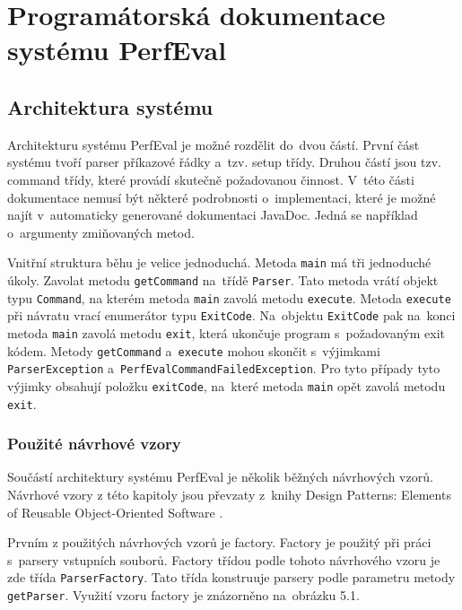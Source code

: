 \chapter{Programátorská dokumentace systému PerfEval}

\section{Architektura systému}

Architekturu systému PerfEval je možné rozdělit do~dvou částí. První část systému tvoří
parser příkazové řádky a~tzv. setup třídy. Druhou částí jsou tzv. command třídy,
které provádí skutečně požadovanou činnost. V~této části dokumentace nemusí být
některé podrobnosti o~implementaci, které je možné najít v~automaticky generované dokumentaci
JavaDoc. Jedná se například o~argumenty zmiňovaných metod.

Vnitřní struktura běhu je velice jednoduchá. Metoda \lstinline{main} má tři jednoduché úkoly.
Zavolat metodu \lstinline{getCommand} na~třídě \lstinline{Parser}. Tato metoda vrátí objekt typu \lstinline{Command},
na kterém metoda \lstinline{main} zavolá metodu \lstinline{execute}. Metoda \lstinline{execute} při návratu vrací enumerátor
typu \lstinline{ExitCode}. Na~objektu \lstinline{ExitCode} pak na~konci metoda \lstinline{main} zavolá metodu \lstinline[keywords={}]{exit},
která ukončuje program s~požadovaným exit kódem. Metody \lstinline{getCommand} a~\lstinline{execute} mohou skončit
s~výjimkami \lstinline{ParserException} a~\lstinline{PerfEvalCommandFailedException}. Pro tyto případy tyto
výjimky obsahují položku \lstinline{exitCode}, na~které metoda \lstinline{main} opět zavolá metodu \lstinline[keywords={}]{exit}.

\subsection{Použité návrhové vzory}

Součástí architektury systému PerfEval je několik běžných návrhových vzorů.
Návrhové vzory z této kapitoly jsou převzaty z~knihy Design Patterns: Elements of Reusable Object-Oriented Software \cite{Patterns}.

Prvním z použitých návrhových vzorů je factory. Factory je použitý
při práci s~parsery vstupních souborů. Factory třídou podle tohoto návrhového vzoru je
zde třída \lstinline{ParserFactory}. Tato třída konstruuje parsery podle parametru metody
\lstinline{getParser}. Využití vzoru factory je znázorněno na~obrázku 5.1.

